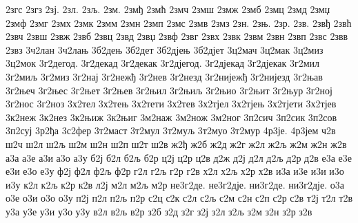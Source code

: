 {2згс
2згз
2зј.
2зл.
2зљ.
2зм.
2змђ
2змћ
2змч
2змш
2змж
2змб
2змц
2змд
2змџ
2змф
2змг
2змх
2змк
2змм
2змн
2змп
2змс
2змв
2змз
2зн.
2зњ.
2зр.
2зв.
2звђ
2звћ
2звч
2звш
2звж
2звб
2звц
2звд
2звџ
2звф
2звг
2звх
2звк
2звм
2звн
2звп
2звс
2звв
2звз
3ч2лан
3ч2лањ
3б2дењ
3б2дет
3б2дјењ
3б2дјет
3ц2мач
3ц2мак
3ц2миз
3ц2мок
3г2дегод.
3г2декад
3г2декак
3г2дјегод.
3г2дјекад
3г2дјекак
3г2мил
3г2миљ
3г2миз
3г2нај
3г2нежђ
3г2нев
3г2незд
3г2нијежђ
3г2нијезд
3г2њав
3г2њеч
3г2њес
3г2њет
3г2њев
3г2њил
3г2њиљ
3г2њио
3г2њит
3г2њур
3г2ној
3г2нос
3г2ноз
3х2тел
3х2тењ
3х2тети
3х2тев
3х2тјел
3х2тјењ
3х2тјети
3х2тјев
3к2неж
3к2нез
3к2њиж
3к2њиг
3м2наж
3м2нож
3м2ног
3п2сич
3п2сик
3п2сов
3п2суј
3р2ђа
3с2фер
3т2маст
3т2мул
3т2муљ
3т2муо
3т2мур
4р3је.
4р3јем
ч2в
ш2ч
ш2л
ш2љ
ш2м
ш2н
ш2п
ш2т
ш2в
ж2ђ
ж2б
ж2д
ж2г
ж2л
ж2љ
ж2м
ж2н
ж2в
а3а
а3е
а3и
а3о
а3у
б2ј
б2л
б2љ
б2р
ц2ј
ц2р
ц2в
д2ж
д2ј
д2л
д2љ
д2р
д2в
е3а
е3е
е3и
е3о
е3у
ф2ј
ф2л
ф2љ
ф2р
г2л
г2љ
г2р
г2в
х2л
х2љ
х2р
х2в
и3а
и3е
и3и
и3о
и3у
к2л
к2љ
к2р
к2в
л2ј
м2л
м2љ
м2р
не3г2де.
не3г2дје.
ни3г2де.
ни3г2дје.
о3а
о3е
о3и
о3о
о3у
п2ј
п2л
п2љ
п2р
с2ц
с2к
с2л
с2љ
с2м
с2н
с2п
с2р
с2в
т2ј
т2л
т2в
у3а
у3е
у3и
у3о
у3у
в2л
в2љ
в2р
з2б
з2д
з2г
з2ј
з2л
з2љ
з2м
з2н
з2р
з2в
}
